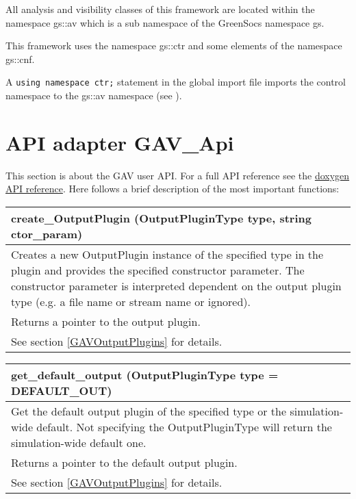 All analysis and visibility classes of this \GreenAV framework are located within the namespace {\sffamily gs::av} which is a sub namespace of the GreenSocs namespace {\sffamily gs}.

This framework uses the \GreenControl namespace {\sffamily gs::ctr} and some elements of the \GreenConfig namespace {\sffamily gs::cnf}.

A \lstinline[language=TeX]|using namespace ctr;| statement in the \GreenAV global import file imports the control namespace to the {\sffamily gs::av} namespace (see ).



\section{API adapter GAV\_Api}
\label{GAVUserAPI}

This section is about the GAV user API. For a full API reference see the \hyperlink{GAVDoxygenRef08target}{doxygen API reference}. Here follows a brief description of the most important functions:


\begin{tabularx}{\textwidth}{|X|} 
  \hline
  {\sffamily create\_OutputPlugin (OutputPluginType type, string ctor\_param)} \\
  \hline
  Creates a new OutputPlugin instance of the specified type in the plugin and provides the specified constructor parameter. The constructor parameter is interpreted dependent on the output plugin type (e.g. a file name or stream name or ignored). \\
  \hline
  Returns a pointer to the output plugin. \\
  \hline
  See section \ref{GAVOutputPlugins} for details. \\
  \hline
\end{tabularx} 

\begin{tabularx}{\textwidth}{|X|} 
  \hline
  {\sffamily get\_default\_output (OutputPluginType type = DEFAULT\_OUT)} \\
  \hline
     Get the default output plugin of the specified type or the simulation-wide default.\newline
     Not specifying the OutputPluginType will return the simulation-wide default one. \\
  \hline
  Returns a pointer to the default output plugin. \\
  \hline
  See section \ref{GAVOutputPlugins} for details. \\
  \hline
\end{tabularx} 

